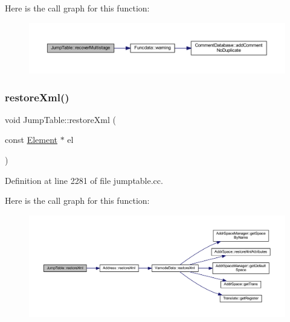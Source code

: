 Here is the call graph for this function\+:
\nopagebreak
\begin{figure}[H]
\begin{center}
\leavevmode
\includegraphics[width=350pt]{class_jump_table_afba6e59f39d15b0f5b231ef9d849625e_cgraph}
\end{center}
\end{figure}
\mbox{\label{class_jump_table_a6c61097c622f85e04db056d9613e94f1}} 
\subsubsection{\texorpdfstring{restoreXml()}{restoreXml()}}
{\footnotesize\ttfamily void Jump\+Table\+::restore\+Xml (\begin{DoxyParamCaption}\item[{const \mbox{\hyperlink{class_element}{Element}} $\ast$}]{el }\end{DoxyParamCaption})}



Definition at line 2281 of file jumptable.\+cc.

Here is the call graph for this function\+:
\nopagebreak
\begin{figure}[H]
\begin{center}
\leavevmode
\includegraphics[width=350pt]{class_jump_table_a6c61097c622f85e04db056d9613e94f1_cgraph}
\end{center}
\end{figure}
\mbox{\label{class_jump_table_a314231b6a4d240c21de28f39fd0a8b57}} 
